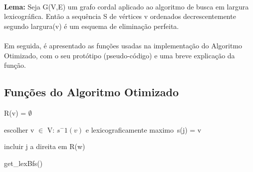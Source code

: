 \documentclass[a4paper, 11pt]{article}
\begin{document}
					\paragraph{}\textbf{Lema:} Seja G(V,E) um grafo cordal aplicado ao algoritmo de busca em largura lexicográfica. Então a sequência S de vértices v ordenados decrescentemente segundo largura(v) é um esquema de eliminação perfeita.
					
					\paragraph{} Em seguida, é apresentado as funções usadas na implementação do Algoritmo Otimizado, com o seu protótipo (pseudo-código) e uma breve explicação da função.
					
					\subsection{Funções do Algoritmo Otimizado}
						\begin{algorithm}[H]
							
							
							{
								R(v) = $\emptyset$
							}
						
							{
								escolher v $\in$ V: $s^-1(v)$ e lexicograficamente maximo\
								s(j) = v
								
								{
									incluir j a  direita  em R(w)
								}
										
							}
							
							\caption{get\_lexBfs()}
							
						\end{algorithm}
					
\end{document}
